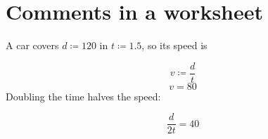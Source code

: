 \documentclass[11pt,a4paper]{article}
\theoremstyle{plain}
\theoremstyle{definition}
\theoremstyle{remark}
\begin{document}
\section*{Comments in a worksheet}

A car covers $d \coloneqq  120$ in $t \coloneqq  1.5$, so its speed is

\begin{equation*}
  v \coloneqq  \frac{d}{t}
\end{equation*}
\begin{equation*}
  v = 80
\end{equation*}
Doubling the time halves the speed:

\begin{equation*}
  \frac{d}{2 t} = 40
\end{equation*}
\end{document}
